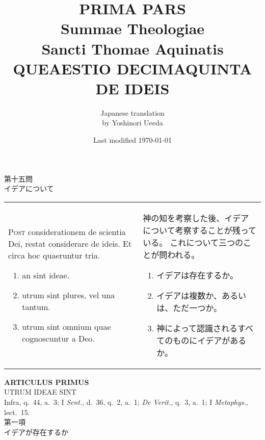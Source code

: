 \documentclass[10pt]{jsarticle} %
\title{{\bf PRIMA PARS}\\{\HUGE Summae Theologiae}\\Sancti Thomae
Aquinatis\\{\sffamily QUEAESTIO DECIMAQUINTA}\\DE IDEIS}
\author{Japanese translation\\by Yoshinori {\sc Ueeda}}
\date{Last modified \today}
\begin{document}
\maketitle
\pagestyle{fancy}

\begin{center}
{\Large 第十五問\\イデアについて}
\end{center}

\begin{longtable}{p{21em}p{21em}}
{\huge P}{\scshape ost} considerationem de scientia Dei, restat
 considerare de ideis. Et circa hoc quaeruntur tria. 

\begin{enumerate}
 \item an sint ideae.
 \item utrum sint plures, vel una tantum.
 \item utrum sint omnium quae cognoscuntur a Deo.
\end{enumerate}


&

神の知を考察した後、イデアについて考察することが残っている。
これについて三つのことが問われる。

\begin{enumerate}
 \item イデアは存在するか。
 \item イデアは複数か、あるいは、ただ一つか。
 \item 神によって認識されるすべてのものにイデアがあるか。
\end{enumerate}

\end{longtable}


\newpage

\begin{center}
 {\Large {\bf ARTICULUS PRIMUS}}\\
 {\large UTRUM IDEAE SINT}\\
 {\footnotesize Infra, q.~44, a.~3; I {\itshape Sent.}, d.~36, q.~2,
 a.~1; {\itshape De Verit.}, q.~3, a.~1; I {\itshape Metaphys.}, lect.~15.}\\
 {\Large 第一項\\イデアが存在するか}
\end{center}
\end{document}
